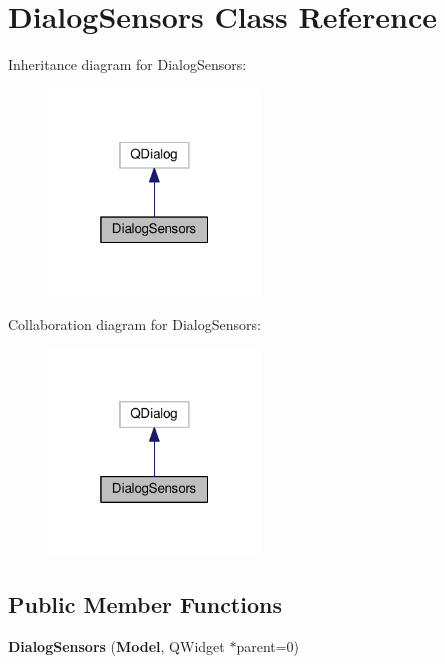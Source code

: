 \section{Dialog\+Sensors Class Reference}
\label{class_dialog_sensors}


Inheritance diagram for Dialog\+Sensors\+:\nopagebreak
\begin{figure}[H]
\begin{center}
\leavevmode
\includegraphics[width=160pt]{class_dialog_sensors__inherit__graph}
\end{center}
\end{figure}


Collaboration diagram for Dialog\+Sensors\+:\nopagebreak
\begin{figure}[H]
\begin{center}
\leavevmode
\includegraphics[width=160pt]{class_dialog_sensors__coll__graph}
\end{center}
\end{figure}
\subsection*{Public Member Functions}
\begin{DoxyCompactItemize}
\item 
{\bfseries Dialog\+Sensors} ({\bf Model}, Q\+Widget $\ast$parent=0)\label{class_dialog_sensors_a11ad645c0bad7c5035df201c98e103ce}

\end{DoxyCompactItemize}
